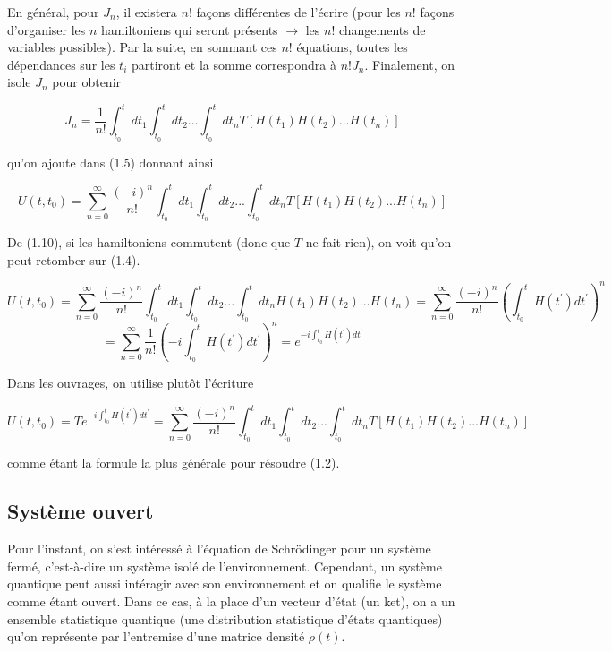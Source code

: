 En général, pour $J_n$, il existera $n!$ façons différentes de l'écrire (pour les $n!$ façons d'organiser les $n$ hamiltoniens qui seront présents $\rightarrow$ les $n!$ changements de variables possibles). Par la suite, en sommant ces $n!$ équations, toutes les dépendances sur les $t_i$ partiront et la somme correspondra à $n!J_n$. Finalement, on isole $J_n$ pour obtenir 

\begin{equation}
    J_n = \frac{1}{n!}\int_{t_0}^{t}dt_1\int_{t_0}^{t}dt_2...\int_{t_0}^{t}dt_n T \left[H(t_1)H(t_2)...H(t_n)\right]
\end{equation}

qu'on ajoute dans (1.5) donnant ainsi

\begin{equation}
    U(t,t_0) = \sum_{n=0}^{\infty}\frac{(-i)^n}{n!}\int_{t_0}^{t}dt_1\int_{t_0}^{t}dt_2...\int_{t_0}^{t}dt_n T \left[H(t_1)H(t_2)...H(t_n)\right]
\end{equation}

De (1.10), si les hamiltoniens commutent (donc que $T$ ne fait rien), on voit qu'on peut retomber sur (1.4).

\begin{equation*}
    U(t,t_0) = \sum_{n=0}^{\infty}\frac{(-i)^n}{n!}\int_{t_0}^{t}dt_1\int_{t_0}^{t}dt_2...\int_{t_0}^{t}dt_n H(t_1)H(t_2)...H(t_n) = \sum_{n=0}^{\infty}\frac{(-i)^n}{n!}\left(\int_{t_0}^{t}H(t^{'})dt^{'}\right)^n
\end{equation*}
\begin{equation*}
    = \sum_{n=0}^{\infty}\frac{1}{n!}\left(-i\int_{t_0}^{t}H(t^{'})dt^{'}\right)^n = e^{-i\int_{t_0}^{t}H(t^{'})dt^{'}}
\end{equation*}

Dans les ouvrages, on utilise plutôt l'écriture

\begin{equation}
    U(t,t_0) = Te^{-i\int_{t_0}^{t}H(t^{'})dt^{'}} = \sum_{n=0}^{\infty}\frac{(-i)^n}{n!}\int_{t_0}^{t}dt_1\int_{t_0}^{t}dt_2...\int_{t_0}^{t}dt_n T \left[H(t_1)H(t_2)...H(t_n)\right]
\end{equation}

comme étant la formule la plus générale pour résoudre (1.2).

\subsection{Système ouvert}
Pour l'instant, on s'est intéressé à l'équation de Schrödinger pour un système fermé, c'est-à-dire un système isolé de l'environnement. Cependant, un système quantique peut aussi intéragir avec son environnement et on qualifie le système comme étant ouvert. Dans ce cas, à la place d'un vecteur d'état (un ket), on a un ensemble statistique quantique (une distribution statistique d'états quantiques) qu'on représente par l'entremise d'une matrice densité $\rho(t)$.

